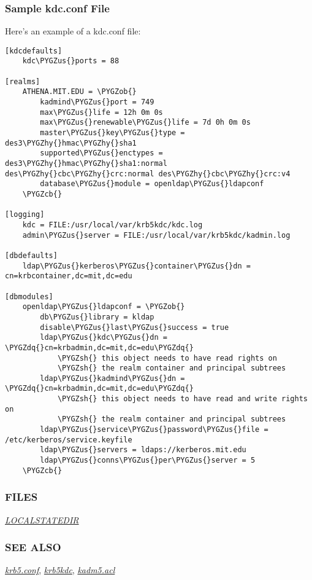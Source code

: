 \documentclass[letterpaper,10pt,english]{sphinxmanual}
\def\PYGZus{\char`\_}
\def\PYGZob{\char`\{}
\def\PYGZcb{\char`\}}
\def\PYGZsh{\char`\#}
\def\PYGZhy{\char`\-}
\def\PYGZdq{\char`\"}
\begin{document}
\subsubsection{Sample kdc.conf File}
\label{admin/conf_files/kdc_conf:sample-kdc-conf-file}
Here's an example of a kdc.conf file:

\begin{Verbatim}[commandchars=\\\{\}]
[kdcdefaults]
    kdc\PYGZus{}ports = 88

[realms]
    ATHENA.MIT.EDU = \PYGZob{}
        kadmind\PYGZus{}port = 749
        max\PYGZus{}life = 12h 0m 0s
        max\PYGZus{}renewable\PYGZus{}life = 7d 0h 0m 0s
        master\PYGZus{}key\PYGZus{}type = des3\PYGZhy{}hmac\PYGZhy{}sha1
        supported\PYGZus{}enctypes = des3\PYGZhy{}hmac\PYGZhy{}sha1:normal des\PYGZhy{}cbc\PYGZhy{}crc:normal des\PYGZhy{}cbc\PYGZhy{}crc:v4
        database\PYGZus{}module = openldap\PYGZus{}ldapconf
    \PYGZcb{}

[logging]
    kdc = FILE:/usr/local/var/krb5kdc/kdc.log
    admin\PYGZus{}server = FILE:/usr/local/var/krb5kdc/kadmin.log

[dbdefaults]
    ldap\PYGZus{}kerberos\PYGZus{}container\PYGZus{}dn = cn=krbcontainer,dc=mit,dc=edu

[dbmodules]
    openldap\PYGZus{}ldapconf = \PYGZob{}
        db\PYGZus{}library = kldap
        disable\PYGZus{}last\PYGZus{}success = true
        ldap\PYGZus{}kdc\PYGZus{}dn = \PYGZdq{}cn=krbadmin,dc=mit,dc=edu\PYGZdq{}
            \PYGZsh{} this object needs to have read rights on
            \PYGZsh{} the realm container and principal subtrees
        ldap\PYGZus{}kadmind\PYGZus{}dn = \PYGZdq{}cn=krbadmin,dc=mit,dc=edu\PYGZdq{}
            \PYGZsh{} this object needs to have read and write rights on
            \PYGZsh{} the realm container and principal subtrees
        ldap\PYGZus{}service\PYGZus{}password\PYGZus{}file = /etc/kerberos/service.keyfile
        ldap\PYGZus{}servers = ldaps://kerberos.mit.edu
        ldap\PYGZus{}conns\PYGZus{}per\PYGZus{}server = 5
    \PYGZcb{}
\end{Verbatim}


\subsubsection{FILES}
\label{admin/conf_files/kdc_conf:files}
{\hyperref[mitK5defaults:paths]{\emph{LOCALSTATEDIR}}}


\subsubsection{SEE ALSO}
\label{admin/conf_files/kdc_conf:see-also}
{\hyperref[admin/conf_files/krb5_conf:krb5-conf-5]{\emph{krb5.conf}}}, {\hyperref[admin/admin_commands/krb5kdc:krb5kdc-8]{\emph{krb5kdc}}}, {\hyperref[admin/conf_files/kadm5_acl:kadm5-acl-5]{\emph{kadm5.acl}}}
\end{document}
